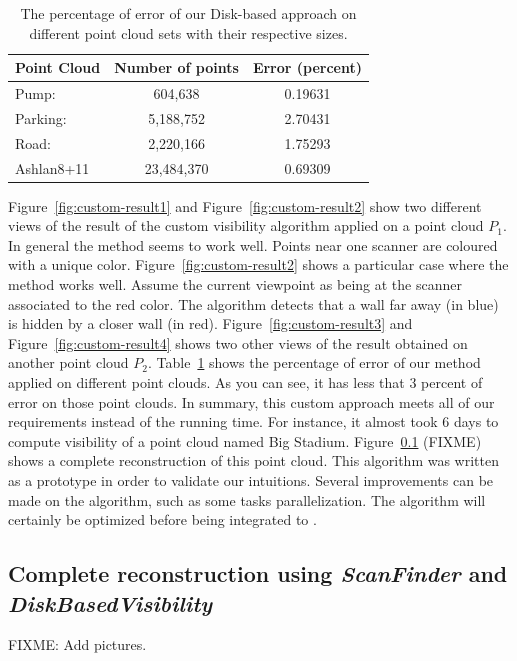 \begin{table}[]
  \centering
  \begin{tabular}{l|c|c}
    Point Cloud & Number of points & Error (percent) \\\hline
    Pump: & 604,638 &  0.19631 \\\hline
    Parking: & 5,188,752 & 2.70431 \\\hline
    Road: & 2,220,166 & 1.75293 \\\hline
    Ashlan8+11 & 23,484,370 & 0.69309
  \end{tabular}
  \caption{The percentage of error of our Disk-based approach on different point cloud sets with their respective sizes.}
  \label{table:vis-error}
\end{table}
Figure~\ref{fig:custom-result1} and Figure~\ref{fig:custom-result2} show two different views of the result of the custom visibility algorithm applied on a point cloud $P_1$. In general the method seems to work well. Points near one scanner are coloured with a unique color. Figure~\ref{fig:custom-result2} shows a particular case where the method works well. Assume the current viewpoint as being at the scanner associated to the red color. The algorithm detects that a wall far away (in blue) is hidden by a closer wall (in red). Figure~\ref{fig:custom-result3} and Figure~\ref{fig:custom-result4} shows two other views of the result obtained on another point cloud $P_2$. Table~\ref{table:vis-error} shows the percentage of error of our method applied on different point clouds. As you can see, it has less that $3$ percent of error on those point clouds. In summary, this custom approach meets all of our requirements instead of the running time. For instance, it almost took 6 days to compute visibility of a point cloud named Big Stadium. Figure~\ref{} (FIXME) shows a complete reconstruction of this point cloud. This algorithm was written as a prototype in order to validate our intuitions. Several improvements can be made on the algorithm, such as some tasks parallelization. The algorithm will certainly be optimized before being integrated to \CC.

\subsection{Complete reconstruction using \emph{ScanFinder} and \emph{DiskBasedVisibility}}
FIXME: Add pictures.
